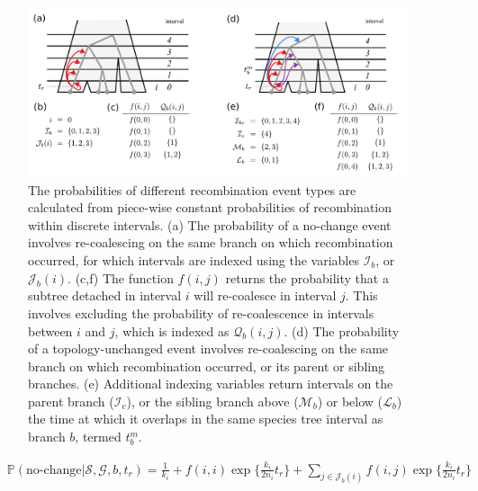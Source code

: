 \documentclass[11pt]{article}
\begin{document}
\begin{figure}[t]
	\centering
	\includegraphics[width=0.99\textwidth]{figures/interval-functions}
	\caption{
		The probabilities of different recombination event types are calculated from 
		piece-wise constant probabilities of recombination within discrete intervals.
		(a) The probability of a no-change event involves re-coalescing on the same 
		branch on which recombination occurred, for which intervals are indexed using
		the variables $\mathcal{I}_b$, or $\mathcal{J}_b(i)$. 
		(c,f) The function $f(i,j)$ returns the probability that a subtree detached 
		in interval $i$ will re-coalesce in interval $j$. This involves excluding
		the probability of re-coalescence in intervals between $i$ and $j$, which is 
		indexed as $\mathcal{Q}_b(i,j)$. 
		(d) The probability of a topology-unchanged event involves re-coalescing on the 
		same branch on which recombination occurred, or its parent or sibling branches. 
		(e) Additional indexing variables return intervals on the parent branch 
		($\mathcal{I}_c$), or the sibling branch above ($\mathcal{M}_b$) or below 
		($\mathcal{L}_b$) the time at which it overlaps in the same species tree interval
		as branch $b$, termed $t_b^m$.
	}
	\label{fig:fig3}
\end{figure}


\begin{equation}
\begin{aligned}
	&\mathbb{P}(\text{no-change} | \mathcal{S},\mathcal{G},b,t_r) = 
	\frac{1}{k_i} + 
	f(i,i) \exp \bigg\{ \frac{k_i}{2n_i} t_r \bigg\} +
	\sum_{j \in \mathcal{J}_b(i)} f(i,j) \exp \bigg\{ \frac{k_i}{2n_i} t_r\bigg\}
\end{aligned}
\end{equation}
\end{document}
